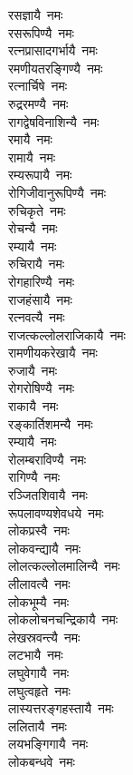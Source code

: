 \begin{multicols}{\maxColumns}
\begin{flushleft}
रसज्ञायै~नमः\\
रसरूपिण्यै~नमः\hfill{}\\
रत्नप्रासादगर्भायै~नमः\\
रमणीयतरङ्गिण्यै~नमः\\
रत्नार्चिषे~नमः\\
रुद्ररमण्यै~नमः\\
रागद्वेषविनाशिन्यै~नमः\\
रमायै~नमः\\
रामायै~नमः\\
रम्यरूपायै~नमः\\
रोगिजीवानुरूपिण्यै~नमः\\
रुचिकृते~नमः\hfill{}\\
रोचन्यै~नमः\\
रम्यायै~नमः\\
रुचिरायै~नमः\\
रोगहारिण्यै~नमः\\
राजहंसायै~नमः\\
रत्नवत्यै~नमः\\
राजत्कल्लोलराजिकायै~नमः\\
रामणीयकरेखायै~नमः\\
रुजायै~नमः\\
रोगरोषिण्यै~नमः\hfill{}\\
राकायै~नमः\\
रङ्कार्तिशमन्यै~नमः\\
रम्यायै~नमः\\
रोलम्बराविण्यै~नमः\\
रागिण्यै~नमः\\
रञ्जितशिवायै~नमः\\
रूपलावण्यशेवधये~नमः\\
लोकप्रस्वै~नमः\\
लोकवन्द्यायै~नमः\\
लोलत्कल्लोलमालिन्यै~नमः\hfill{}\\
लीलावत्यै~नमः\\
लोकभूम्यै~नमः\\
लोकलोचनचन्द्रिकायै~नमः\\
लेखस्रवन्त्यै~नमः\\
लटभायै~नमः\\
लघुवेगायै~नमः\\
लघुत्वहृते~नमः\\
लास्यत्तरङ्गहस्तायै~नमः\\
ललितायै~नमः\\
लयभङ्गिगायै~नमः\hfill{}\\
लोकबन्धवे~नमः\\

\end{flushleft}
\end{multicols}
